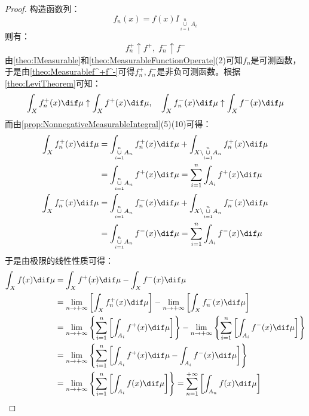 \begin{proof}
	构造函数列：
	\begin{equation*}
		f_n(x)=f(x)I_{\underset{i=1}{\overset{n}{\cup}}A_i}
	\end{equation*}
	则有：
	\begin{equation*}
		f_n^+\uparrow f^+,\;f_n^-\uparrow f^-
	\end{equation*}
	由\cref{theo:IMeasurable}和\cref{theo:MeasurableFunctionOperate}(2)可知$f_n$是可测函数，于是由\cref{theo:Measurablef^+f^-}可得$f_n^+,f_n^-$是非负可测函数。根据\cref{theo:LeviTheorem}可知：
	\begin{equation*}
		\int_{X}f_n^+(x)\dif\mu\uparrow\int_{X}f^+(x)\dif\mu,\quad\int_{X}f_n^-(x)\dif\mu\uparrow\int_{X}f^-(x)\dif\mu
	\end{equation*}
	而由\cref{prop:NonnegativeMeasurableIntegral}(5)(10)可得：
	\begin{gather*}
		\begin{aligned}
			\int_{X}f_n^+(x)\dif\mu
			&=\int_{\underset{i=1}{\overset{n}{\cup}}A_n}f_n^+(x)\dif\mu+\int_{X\backslash\underset{i=1}{\overset{n}{\cup}}A_n}f_n^+(x)\dif\mu \\
			&=\int_{\underset{i=1}{\overset{n}{\cup}}A_n}f^+(x)\dif\mu
			=\sum_{i=1}^{n}\int_{A_i}f^+(x)\dif\mu
		\end{aligned} \\
		\begin{aligned}
			\int_{X}f_n^-(x)\dif\mu
			&=\int_{\underset{i=1}{\overset{n}{\cup}}A_n}f_n^-(x)\dif\mu+\int_{X\backslash\underset{i=1}{\overset{n}{\cup}}A_n}f_n^-(x)\dif\mu \\
			&=\int_{\underset{i=1}{\overset{n}{\cup}}A_n}f^-(x)\dif\mu
			=\sum_{i=1}^{n}\int_{A_i}f^-(x)\dif\mu
		\end{aligned} 
	\end{gather*}
	于是由极限的线性性质可得：
	\begin{align*}
		\int_{X}f(x)\dif\mu&=\int_{X}f^+(x)\dif\mu-\int_{X}f^-(x)\dif\mu \\
		&=\lim_{n\to+\infty}\left[\int_{X}f_n^+(x)\dif\mu\right]-\lim_{n\to+\infty}\left[\int_{X}f_n^-(x)\dif\mu\right] \\
		&=\lim_{n\to+\infty}\left\{\sum_{i=1}^{n}\left[\int_{A_i}f^+(x)\dif\mu\right]\right\}-\lim_{n\to+\infty}\left\{\sum_{i=1}^{n}\left[\int_{A_i}f^-(x)\dif\mu\right]\right\} \\
		&=\lim_{n\to+\infty}\left\{\sum_{i=1}^{n}\left[\int_{A_i}f^+(x)\dif\mu-\int_{A_i}f^-(x)\dif\mu\right]\right\} \\
		&=\lim_{n\to+\infty}\left\{\sum_{i=1}^{n}\left[\int_{A_i}f(x)\dif\mu\right]\right\}=\sum_{n=1}^{+\infty}\left[\int_{A_n}f(x)\dif\mu\right]\qedhere
	\end{align*}
\end{proof}
